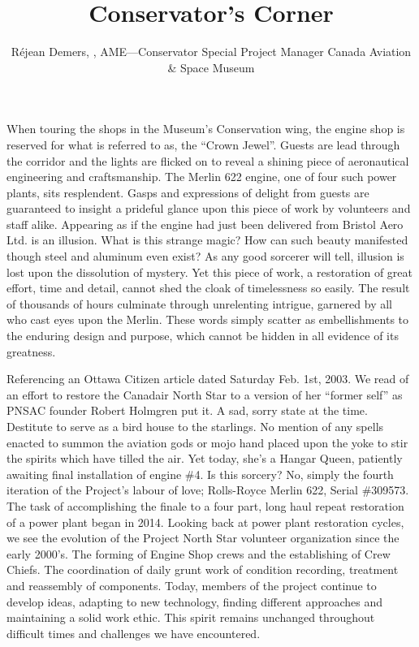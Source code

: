 %


\title{Conservator's Corner}
\author{R\'{e}jean Demers, , AME---Conservator \/ Special Project Manager
Canada Aviation \& Space Museum}

\maketitle


When touring the shops in the Museum’s Conservation wing, the engine shop is
reserved for what is referred to as, the “Crown Jewel”. Guests are lead through
the corridor and the lights are flicked on to reveal a shining piece of
aeronautical engineering and craftsmanship. The Merlin 622 engine, one of four
such power plants, sits resplendent. Gasps and expressions of delight from
guests are guaranteed to insight a prideful glance upon this piece of work by
volunteers and staff alike. Appearing as if the engine had just been delivered
from Bristol Aero Ltd. is an illusion. What is this strange magic? How can such
beauty manifested though steel and aluminum even exist? As any good sorcerer
will tell, illusion is lost upon the dissolution of mystery. Yet this piece of
work, a restoration of great effort, time and detail, cannot shed the cloak of
timelessness so easily. The result of thousands of hours culminate through
unrelenting intrigue, garnered by all who cast eyes upon the Merlin. These
words simply scatter as embellishments to the enduring design and purpose,
which cannot be hidden in all evidence of its greatness. 

Referencing an Ottawa Citizen article dated Saturday Feb. 1st, 2003. We read of
an effort to restore the Canadair North Star to a version of her “former self”
as PNSAC founder Robert Holmgren put it. A sad, sorry state at the time.
Destitute to serve as a bird house to the starlings. No mention of any spells
enacted to summon the aviation gods or mojo hand placed upon the yoke to stir
the spirits which have tilled the air.  Yet today, she’s a Hangar Queen,
patiently awaiting final installation of engine \#4. Is this sorcery? No,
simply the fourth iteration of the Project’s labour of love; Rolls-Royce Merlin
622, Serial \#309573. The task of accomplishing the finale to a four part, long
haul repeat restoration of a power plant began in 2014. Looking back at power
plant restoration cycles, we see the evolution of the Project North Star
volunteer organization since the early 2000’s. The forming of Engine Shop crews
and the establishing of Crew Chiefs. The coordination of daily grunt work of
condition recording, treatment and reassembly of components. Today, members of
the project continue to develop ideas, adapting to new technology, finding
different approaches and maintaining a solid work ethic. This spirit remains
unchanged throughout difficult times and challenges we have encountered. 

